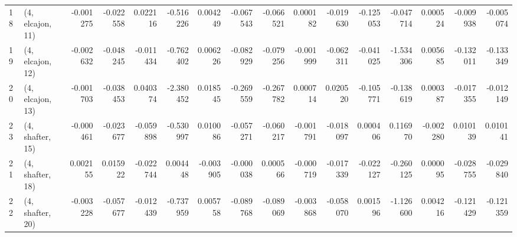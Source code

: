 \begin{tabular}{llrrrrrrrrrrrrrr}
18 &  (4, elcajon, 11) &  -0.001275 & -0.022558 &  0.022116 &  -0.516226 &  0.004249 &  -0.067543 & -0.066521 &  0.000182 & -0.019630 & -0.125053 &  -0.047714 &  0.000524 & -0.009938 & -0.005074 \\
19 &  (4, elcajon, 12) &  -0.002632 & -0.048245 & -0.011434 &  -0.762402 &  0.006226 &  -0.082929 & -0.079256 & -0.001999 & -0.062311 & -0.041025 &  -1.534306 &  0.005685 & -0.132011 & -0.133349 \\
20 &  (4, elcajon, 13) &  -0.001703 & -0.038453 &  0.040374 &  -2.380452 &  0.018545 &  -0.269559 & -0.267782 &  0.000714 &  0.020520 & -0.105771 &  -0.138619 &  0.000387 & -0.017355 & -0.012149 \\
23 &  (4, shafter, 15) &  -0.000461 & -0.023677 & -0.059898 &  -0.530997 &  0.010086 &  -0.057271 & -0.060217 & -0.001791 & -0.018097 &  0.000406 &   0.116970 & -0.002280 &  0.010139 &  0.010141 \\
21 &  (4, shafter, 18) &   0.002155 &  0.015922 & -0.022744 &   0.004448 & -0.003905 &  -0.000038 &  0.000566 & -0.000719 & -0.017339 & -0.022127 &  -0.260125 &  0.000095 & -0.028755 & -0.029840 \\
22 &  (4, shafter, 20) &  -0.003228 & -0.057677 & -0.012439 &  -0.737959 &  0.005758 &  -0.089768 & -0.089069 & -0.003868 & -0.058070 &  0.001596 &  -1.126600 &  0.004216 & -0.121429 & -0.121359 \\
\bottomrule
\end{tabular}
